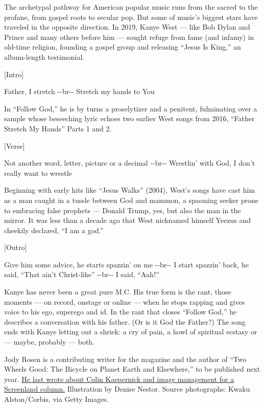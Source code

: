 The archetypal pathway for American popular music runs from the sacred
to the profane, from gospel roots to secular pop. But some of music's
biggest stars have traveled in the opposite direction. In 2019, Kanye
West --- like Bob Dylan and Prince and many others before him --- sought
refuge from fame (and infamy) in old-time religion, founding a gospel
group and releasing ``Jesus Is King,'' an album-length testimonial.

{[}Intro{]}

Father, I stretch -\/-br-\/- Stretch my hands to You

In ``Follow God,'' he is by turns a proselytizer and a penitent,
fulminating over a sample whose beseeching lyric echoes two earlier West
songs from 2016, ``Father Stretch My Hands'' Parts 1 and 2.

{[}Verse{]}

Not another word, letter, picture or a decimal -\/-br-\/- Wrestlin' with
God, I don't really want to wrestle

Beginning with early hits like ``Jesus Walks'' (2004), West's songs have
cast him as a man caught in a tussle between God and mammon, a spasming
seeker prone to embracing false prophets --- Donald Trump, yes, but also
the man in the mirror. It was less than a decade ago that West nicknamed
himself Yeezus and cheekily declared, ``I am a god.''

{[}Outro{]}

Give him some advice, he starts spazzin' on me -\/-br-\/- I start
spazzin' back, he said, ``That ain't Christ-like'' -\/-br-\/- I said,
``Aah!''

Kanye has never been a great pure M.C. His true form is the rant, those
moments --- on record, onstage or online --- when he stops rapping and
gives voice to his ego, superego and id. In the rant that closes
``Follow God,'' he describes a conversation with his father. (Or is it
God the Father?) The song ends with Kanye letting out a shriek: a cry of
pain, a howl of spiritual ecstasy or --- maybe, probably --- both.

Jody Rosen is a contributing writer for the magazine and the author of
``Two Wheels Good: The Bicycle on Planet Earth and Elsewhere,'' to be
published next year.
\href{https://www.nytimes3xbfgragh.onion/2019/12/12/magazine/colin-kaepernick-nfl-video.html}{He
last wrote about Colin Kaepernick and image management for a Screenland
column.} Illustration by Denise Nestor. Source photographs: Kwaku
Alston/Corbis, via Getty Images.

